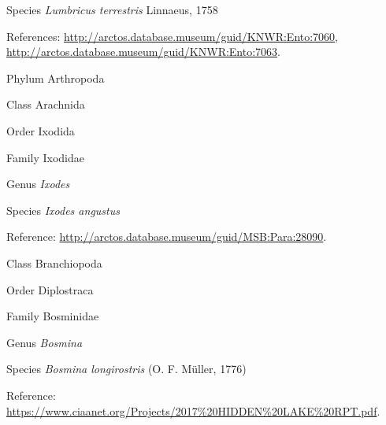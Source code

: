 \documentclass[9pt, article]{memoir}
\begin{document}
\begin{multicols}{2}
\vspace{6pt}\noindent\hspace{36pt}Species \textit{Lumbricus terrestris} Linnaeus, 1758


\vspace{6pt}References: 
\url{http://arctos.database.museum/guid/KNWR:Ento:7060}, 
\url{http://arctos.database.museum/guid/KNWR:Ento:7063}.

\vspace{6pt}\noindent\hspace{6pt}Phylum Arthropoda


\vspace{6pt}\noindent\hspace{12pt}Class Arachnida


\vspace{6pt}\noindent\hspace{18pt}Order Ixodida


\vspace{6pt}\noindent\hspace{24pt}Family Ixodidae


\vspace{6pt}\noindent\hspace{30pt}Genus \textit{Ixodes}


\vspace{6pt}\noindent\hspace{36pt}Species \textit{Ixodes angustus}


\vspace{6pt}Reference: 
\url{http://arctos.database.museum/guid/MSB:Para:28090}.

\vspace{6pt}\noindent\hspace{12pt}Class Branchiopoda


\vspace{6pt}\noindent\hspace{18pt}Order Diplostraca


\vspace{6pt}\noindent\hspace{24pt}Family Bosminidae


\vspace{6pt}\noindent\hspace{30pt}Genus \textit{Bosmina}


\vspace{6pt}\noindent\hspace{36pt}Species \textit{Bosmina longirostris} (O. F. Müller, 1776)


\vspace{6pt}Reference: 
\url{https://www.ciaanet.org/Projects/2017%20HIDDEN%20LAKE%20RPT.pdf}.


\end{multicols}
\end{document}
